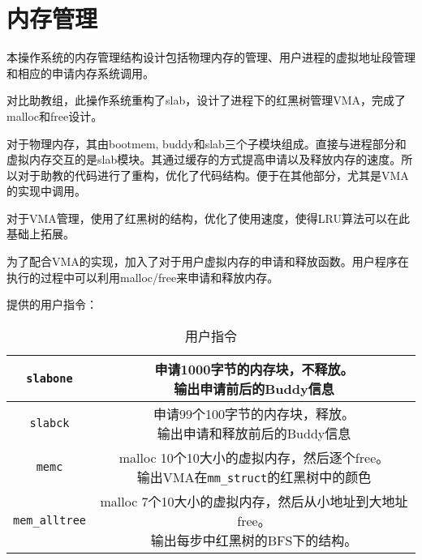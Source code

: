 \section{内存管理}

本操作系统的内存管理结构设计包括物理内存的管理、用户进程的虚拟地址段管理和相应的申请内存系统调用。

对比助教组，此操作系统重构了slab，设计了进程下的红黑树管理VMA，完成了malloc和free设计。

对于物理内存，其由bootmem, buddy和slab三个子模块组成。直接与进程部分和虚拟内存交互的是slab模块。其通过缓存的方式提高申请以及释放内存的速度。所以对于助教的代码进行了重构，优化了代码结构。便于在其他部分，尤其是VMA的实现中调用。

对于VMA管理，使用了红黑树的结构，优化了使用速度，使得LRU算法可以在此基础上拓展。

为了配合VMA的实现，加入了对于用户虚拟内存的申请和释放函数。用户程序在执行的过程中可以利用malloc/free来申请和释放内存。

提供的用户指令：

\begin{table}[H]
  \centering
  \caption{用户指令}
  \begin{tabular}{|c|c|}
    \hline
    \texttt{slabone} & \makecell{申请1000字节的内存块，不释放。\\输出申请前后的Buddy信息} \\
    \hline
    \texttt{slabck} & \makecell{申请99个100字节的内存块，释放。\\输出申请和释放前后的Buddy信息} \\
    \hline
    \texttt{memc} & \makecell{malloc 10个10大小的虚拟内存，然后逐个free。\\输出VMA在\texttt{mm\_struct}的红黑树中的颜色} \\
    \hline
    \texttt{mem\_alltree} & \makecell{malloc 7个10大小的虚拟内存，然后从小地址到大地址free。\\输出每步中红黑树的BFS下的结构。} \\
    \hline
  \end{tabular}
\end{table}
